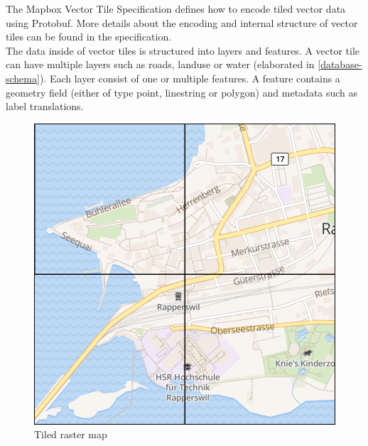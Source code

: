 \noindent\begin{minipage}[t]{0.48\linewidth}
    \vspace{0pt}
    The Mapbox Vector Tile Specification defines how to encode tiled vector data using Protobuf. More details about the encoding and internal structure of vector tiles can be found in the specification\cite{104_mapbox.com_2016}.\\
    
    The data inside of vector tiles is structured into layers and features. A vector tile can have multiple layers such as roads, landuse or water (elaborated in \autoref{database-schema}). Each layer consist of one or multiple features. A feature contains a geometry field (either of type point, linestring or polygon) and metadata such as label translations.
\end{minipage}
\hfill
\begin{minipage}[t]{0.48\linewidth}
    \vspace{-10pt}
    \begin{figure}[H]
        \centering
        \includegraphics[width=\textwidth]{images/tiled_raster}
        \caption{Tiled raster map}
        \label{tiled_raster_map}
    \end{figure}
\end{minipage}




